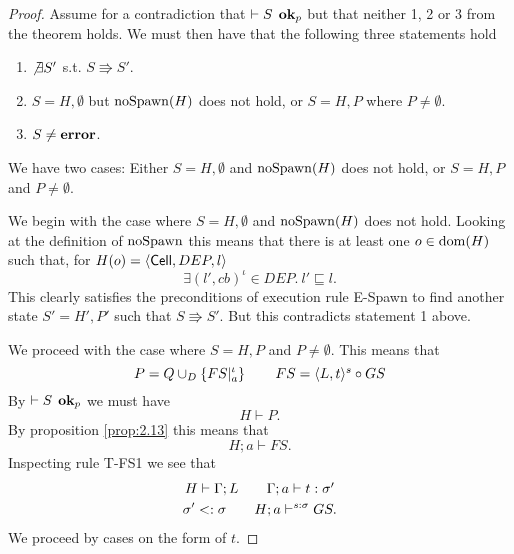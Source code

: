 \begin{proof}
  Assume for a contradiction that $\vdash S \:\: \mbox{{\bf ok}$_p$}$ but that neither 1,
  2 or 3 from the theorem holds. We must then have that the following three
  statements hold
  \begin{enumerate}
    \item $\not\exists S'$ s.t. $S \Rrightarrow S'$.
    \item $S = H, \emptyset$ but $\mbox{$\mathrm{noSpawn}$}(H)$ does not hold, or $S = H, P$
      where $P \neq \emptyset$.
    \item $S \neq \mbox{{\bf error}}$.
  \end{enumerate}
  We have two cases: Either $S = H, \emptyset$ and $\mbox{$\mathrm{noSpawn}$}(H)$ does not hold,
  or $S = H, P$ and $P \neq \emptyset$.

  We begin with the case where $S = H, \emptyset$ and $\mbox{$\mathrm{noSpawn}$}(H)$ does not
  hold. Looking at the definition of $\mbox{$\mathrm{noSpawn}$}$ this means that there is at
  least one $o \in \mbox{$\mathrm{dom}$}(H)$ such that, for $H(o) = \mbox{$\langle \mbox{$\mathsf{Cell}$}{}, DEP, l \rangle$}$
  \begin{equation*}
    \exists (l', cb)^\iota \in DEP. \: l' \sqsubseteq l.
  \end{equation*}
  This clearly satisfies the preconditions of execution rule {\sc E-Spawn} to
  find another state $S' = H', P'$ such that $S \Rrightarrow S'$. But this
  contradicts statement 1 above.

  We proceed with the case where $S = H, P$ and $P \neq \emptyset$. This means
  that
  \begin{equation*}
    P = Q \cup_D \left\{ FS|_a^\iota \right\} \quad\quad FS = \mbox{$\langle L, t \rangle^s$} \circ GS
  \end{equation*}
  By $\vdash S \:\: \mbox{{\bf ok}$_p$}$ we must have
  \begin{equation*}
    H \vdash P.
  \end{equation*}
  By proposition \ref{prop:2.13} this means that 
  \begin{equation*}
    H;a \vdash FS.
  \end{equation*}
  Inspecting rule {\sc T-FS1} we see that
  \begin{equation} \label{eq:prog_tbase}
    \begin{gathered}
      H \vdash \Gamma;L \quad\quad \mbox{$\Gamma;a\vdash t:\sigma'$} \\
      \sigma' <: \sigma \quad\quad H;a \vdash^{s: \sigma} GS.
    \end{gathered}
  \end{equation}
  We proceed by cases on the form of $t$. 
  

\end{proof}
